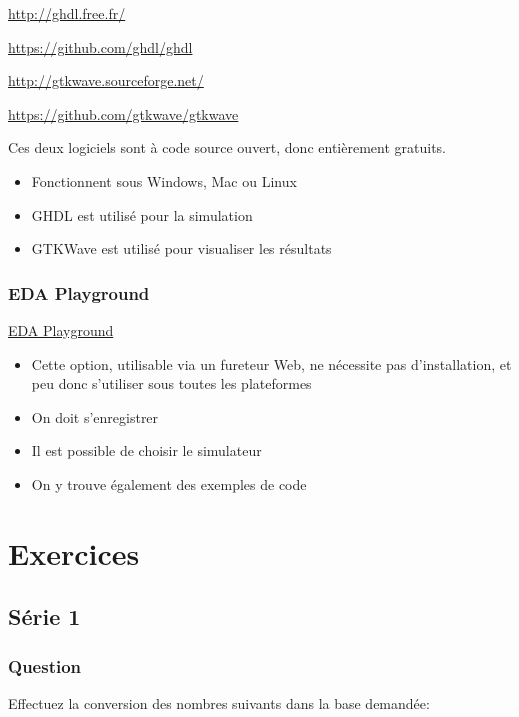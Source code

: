 \documentclass[11pt]{article}
\begin{document}
\url{http://ghdl.free.fr/}

\url{https://github.com/ghdl/ghdl}

\url{http://gtkwave.sourceforge.net/}

\url{https://github.com/gtkwave/gtkwave}

Ces deux logiciels sont à code source ouvert, donc entièrement
gratuits.

\begin{itemize}
\item Fonctionnent sous Windows, Mac ou Linux
\item GHDL est utilisé pour la simulation
\item GTKWave est utilisé pour visualiser les résultats
\end{itemize}

\subsubsection{EDA Playground}
\label{sec:orgdc7380e}

\href{https://www.edaplayground.com/}{EDA Playground}

\begin{itemize}
\item Cette option, utilisable via un fureteur Web, ne nécessite pas
d'installation, et peu donc s'utiliser sous toutes les plateformes
\item On doit s'enregistrer
\item Il est possible de choisir le simulateur
\item On y trouve également des exemples de code
\end{itemize}


\section{Exercices}
\label{sec:org14c7d80}

\subsection*{Série 1}
\label{sec:orgaa8d240}
\subsubsection*{Question}
\label{sec:orge27a233}
Effectuez la conversion des nombres suivants dans la base demandée:
\end{document}
